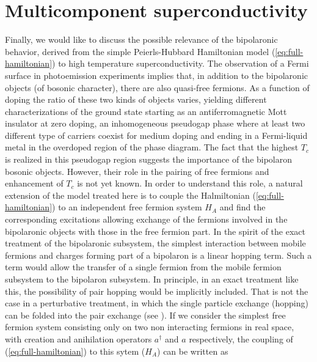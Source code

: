 \section{Multicomponent superconductivity}
\label{sec:multiSuperc}

Finally, we would like to discuss the possible relevance of the bipolaronic behavior, derived from the simple Peierls-Hubbard Hamiltonian model (\ref{eq:full-hamiltonian}) to high temperature superconductivity. 
The observation of a Fermi surface in photoemission experiments \cite{Ding1996,Hussey2003} implies that, in addition to the bipolaronic objects (of bosonic character), there are also quasi-free fermions. 
As a function of doping the ratio of these two kinds of objects varies, yielding different characterizations of the ground state starting as an antiferromagnetic Mott insulator at zero doping, an inhomogeneous pseudogap phase where at least two different type of carriers coexist for medium doping and ending in a Fermi-liquid metal in the overdoped region of the phase diagram. 
The fact that the highest $T_c$  is realized in this pseudogap region suggests the importance of the bipolaron bosonic objects. 
However, their role in the pairing of free fermions and enhancement of $T_c$ is not yet known. 
In order to understand this role, a natural extension of the model treated here is to couple the Halmiltonian  (\ref{eq:full-hamiltonian}) to an independent free fermion system $H_A$ and find the corresponding excitations allowing exchange of the fermions involved in the bipolaronic objects with those in the free fermion part. 
In the spirit of the exact treatment of the bipolaronic subsystem, the simplest interaction between mobile fermions and charges forming part of a bipolaron is a linear hopping term. 
Such a term would allow the transfer of a single fermion from the mobile fermion subsystem to the bipolaron subsystem. 
In principle, in an exact treatment like this, the possibility of pair hopping would be implicitly included. 
That is not the case in a perturbative treatment, in which the single particle exchange (hopping) can be folded into the pair exchange (see \cite{Bar-Yam1991}).
If we consider the simplest free fermion system consisting only on two non interacting fermions in real space, with creation and anihilation operators $a^\dagger$ and $a$ respectively, the coupling of (\ref{eq:full-hamiltonian}) to this sytem ($H_A$) can be written as

